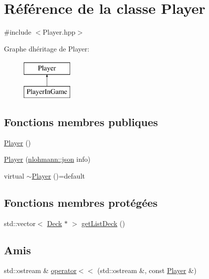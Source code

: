\hypertarget{classPlayer}{}\section{Référence de la classe Player}
\label{classPlayer}


{\ttfamily \#include $<$Player.\+hpp$>$}

Graphe d\textquotesingle{}héritage de Player\+:\begin{figure}[H]
\begin{center}
\leavevmode
\includegraphics[height=2.000000cm]{classPlayer}
\end{center}
\end{figure}
\subsection*{Fonctions membres publiques}
\begin{DoxyCompactItemize}
\item 
\hyperlink{classPlayer_affe0cc3cb714f6deb4e62f0c0d3f1fd8}{Player} ()
\item 
\hyperlink{classPlayer_acc846c5b50dc8298462ae770d3d9622c}{Player} (\hyperlink{CardManager_8hpp_ab701e3ac61a85b337ec5c1abaad6742d}{nlohmann\+::json} info)
\item 
virtual \hyperlink{classPlayer_a11017c0ed8a639f3b1308ab167fbeca2}{$\sim$\+Player} ()=default
\end{DoxyCompactItemize}
\subsection*{Fonctions membres protégées}
\begin{DoxyCompactItemize}
\item 
std\+::vector$<$ \hyperlink{classDeck}{Deck} $\ast$ $>$ \hyperlink{classPlayer_ad3e0232a0013556f3dc6a7cf3219c5e3}{get\+List\+Deck} ()
\end{DoxyCompactItemize}
\subsection*{Amis}
\begin{DoxyCompactItemize}
\item 
std\+::ostream \& \hyperlink{classPlayer_a09ccce2cf3a3aaa6af4721b94eb301d9}{operator$<$$<$} (std\+::ostream \&, const \hyperlink{classPlayer}{Player} \&)
\end{DoxyCompactItemize}


